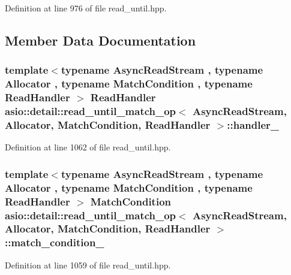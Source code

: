 Definition at line 976 of file read\+\_\+until.\+hpp.



\subsection{Member Data Documentation}
\hypertarget{classasio_1_1detail_1_1read__until__match__op_a7e60b01ad7c7cd03d8291da54e8aec89}{}
\subsubsection[{handler\+\_\+}]{\setlength{\rightskip}{0pt plus 5cm}template$<$typename Async\+Read\+Stream , typename Allocator , typename Match\+Condition , typename Read\+Handler $>$ Read\+Handler {\bf asio\+::detail\+::read\+\_\+until\+\_\+match\+\_\+op}$<$ Async\+Read\+Stream, Allocator, Match\+Condition, Read\+Handler $>$\+::handler\+\_\+}\label{classasio_1_1detail_1_1read__until__match__op_a7e60b01ad7c7cd03d8291da54e8aec89}


Definition at line 1062 of file read\+\_\+until.\+hpp.

\hypertarget{classasio_1_1detail_1_1read__until__match__op_a070acf7946b3b92a8e16a4255e03049e}{}
\subsubsection[{match\+\_\+condition\+\_\+}]{\setlength{\rightskip}{0pt plus 5cm}template$<$typename Async\+Read\+Stream , typename Allocator , typename Match\+Condition , typename Read\+Handler $>$ Match\+Condition {\bf asio\+::detail\+::read\+\_\+until\+\_\+match\+\_\+op}$<$ Async\+Read\+Stream, Allocator, Match\+Condition, Read\+Handler $>$\+::match\+\_\+condition\+\_\+}\label{classasio_1_1detail_1_1read__until__match__op_a070acf7946b3b92a8e16a4255e03049e}


Definition at line 1059 of file read\+\_\+until.\+hpp.

